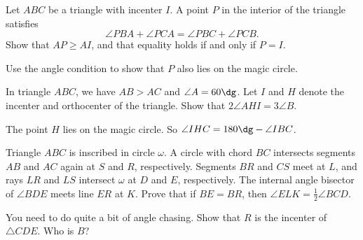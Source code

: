 \documentclass[11pt]{scrartcl}
\begin{document}
\begin{problem}
  [IMO 2006] Let $ABC$ be a triangle with incenter $I$. A point $P$ in the interior of the triangle satisfies \[\angle PBA+\angle PCA = \angle PBC+\angle PCB.\] Show that $AP \geq AI$, and that equality holds if and only if $P=I$.
  \begin{hint}
    Use the angle condition to show that $P$ also lies on the magic circle.
  \end{hint}
\end{problem}


\begin{problem}
  [APMO 2007] In triangle $ABC$, we have $AB > AC$ and $\angle A = 60\dg$.
  Let $I$ and $H$ denote the incenter and orthocenter of the triangle.
  Show that $2\angle AHI = 3\angle B$.
  \begin{hint}
    The point $H$ lies on the magic circle.
    So $\angle IHC = 180\dg - \angle IBC$.
  \end{hint}
\end{problem}

\begin{problem}
  Triangle $ABC$ is inscribed in circle $\omega$.
  A circle with chord $BC$ intersects segments $AB$ and $AC$ again at $S$ and $R$, respectively.
  Segments $BR$ and $CS$ meet at $L$, and rays $LR$ and $LS$ intersect $\omega$ at $D$ and $E$, respectively.
  The internal angle bisector of $\angle BDE$ meets line $ER$ at $K$.
  Prove that if $BE = BR$, then $\angle ELK = \tfrac{1}{2} \angle BCD$.
  \begin{hint}
    You need to do quite a bit of angle chasing.
    Show that $R$ is the incenter of $\triangle CDE$.
    Who is $B$?
  \end{hint}
\end{problem}
\end{document}
